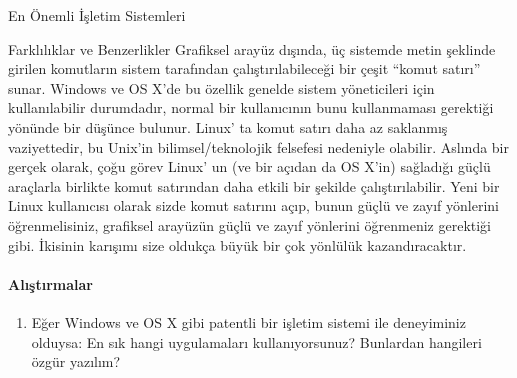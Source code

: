 \begin{section}{En Önemli İşletim Sistemleri}
\begin{subsection}{Farklılıklar ve Benzerlikler}
Grafiksel arayüz dışında, üç sistemde metin şeklinde girilen komutların sistem tarafından çalıştırılabileceği bir çeşit “komut satırı” sunar. Windows ve OS X'de bu özellik genelde sistem yöneticileri için kullanılabilir durumdadır, normal bir kullanıcının bunu kullanmaması gerektiği yönünde bir düşünce bulunur. Linux' ta komut satırı daha az saklanmış vaziyettedir, bu Unix'in bilimsel/teknolojik felsefesi nedeniyle olabilir. Aslında bir gerçek olarak, çoğu görev Linux' un (ve bir açıdan da OS X'in) sağladığı güçlü araçlarla birlikte komut satırından daha etkili bir şekilde çalıştırılabilir. Yeni bir Linux kullanıcısı olarak sizde komut satırını açıp, bunun güçlü ve zayıf yönlerini öğrenmelisiniz, grafiksel arayüzün güçlü ve zayıf yönlerini öğrenmeniz gerektiği gibi. İkisinin karışımı size oldukça büyük bir çok yönlülük kazandıracaktır.
\paragraph{{\Huge{\PencilLeftDown}}Alıştırmalar}{
\begin{enumerate}
 \item Eğer Windows ve OS X gibi patentli bir işletim sistemi ile deneyiminiz olduysa: En sık hangi uygulamaları kullanıyorsunuz? Bunlardan hangileri özgür yazılım?
\end{enumerate}}
\end{subsection}
\end{section}

